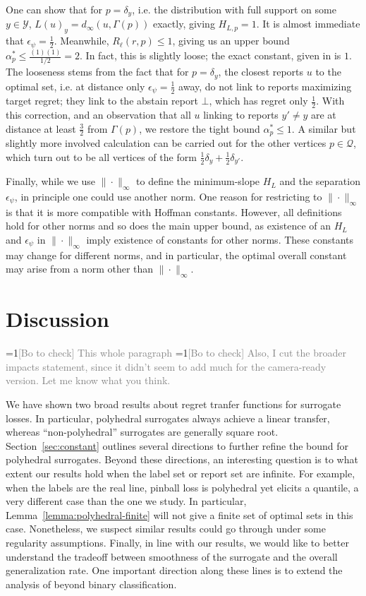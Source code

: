 \documentclass{article}
\theoremstyle{definition}\newtheorem{definition}{Definition}
\theoremstyle{definition}\newtheorem{assumption}{Assumption}
\newcommand{\Comments}{1}
\newcommand{\mynote}[2]{\ifnum\Comments=1\textcolor{#1}{#2}\fi}
\newcommand{\bocheck}[1]{\mynote{gray}{[Bo to check] #1}}
\newcommand{\Y}{\mathcal{Y}}
\begin{document}
One can show that for $p = \delta_y$, i.e. the distribution with full support on some $y \in \Y$, $L(u)_y = d_{\infty}(u,\Gamma(p))$ exactly, giving $H_{L,p} = 1$.
It is almost immediate that $\epsilon_{\psi} = \tfrac{1}{2}$.
Meanwhile, $R_{\ell}(r,p) \leq 1$, giving us an upper bound $\alpha^*_p \leq \frac{(1)(1)}{1/2} = 2$.
In fact, this is slightly loose; the exact constant, given in \cite{ramaswamy2018consistent} is $1$.
The looseness stems from the fact that for $p = \delta_y$, the closest reports $u$ to the optimal set, i.e. at distance only $\epsilon_{\psi} = \tfrac{1}{2}$ away, do not link to reports maximizing target regret; they link to the abstain report $\bot$, which has regret only $\tfrac{1}{2}$.
With this correction, and an observation that all $u$ linking to reports $y' \neq y$ are at distance at least $\tfrac{3}{2}$ from $\Gamma(p)$, we restore the tight bound $\alpha^*_p \leq 1$.
A similar but slightly more involved calculation can be carried out for the other vertices $p \in \mathcal{Q}$, which turn out to be all vertices of the form $\tfrac{1}{2} \delta_y + \tfrac{1}{2} \delta_{y'}$.

Finally, while we use $\|\cdot\|_{\infty}$ to define the minimum-slope $H_L$ and the separation $\epsilon_\psi$, in principle one could use another norm.
One reason for restricting to $\|\cdot\|_\infty$ is that it is more compatible with Hoffman constants.
However, all definitions hold for other norms and so does the main upper bound, as existence of an $H_L$ and $\epsilon_{\psi}$ in $\|\cdot\|_{\infty}$ imply existence of constants for other norms.
These constants may change for different norms, and in particular, the optimal overall constant may arise from a norm other than $\|\cdot\|_\infty$.


\section{Discussion}

\bocheck{This whole paragraph}
\bocheck{Also, I cut the broader impacts statement, since it didn't seem to add much for the camera-ready version.  Let me know what you think.}

We have shown two broad results about regret tranfer functions for surrogate losses.
In particular, polyhedral surrogates always achieve a linear transfer, whereas ``non-polyhedral'' surrogates are generally square root.
Section~\ref{sec:constant} outlines several directions to further refine the bound for polyhedral surrogates.
Beyond these directions, an interesting question is to what extent our results hold when the label set or report set are infinite.
For example, when the labels are the real line, pinball loss is polyhedral yet elicits a quantile, a very different case than the one we study.
In particular, Lemma~\ref{lemma:polyhedral-finite} will not give a finite set of optimal sets in this case.
Nonetheless, we suspect similar results could go through under some regularity assumptions.
Finally, in line with our results, we would like to better understand the tradeoff between smoothness of the surrogate and the overall generalization rate.
One important direction along these lines is to extend the analysis of \citet{mahdavi2014binary} beyond binary classification.
\end{document}
